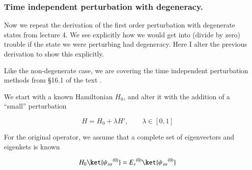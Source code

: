%
%
%
%
%
\subsubsection{Time independent perturbation with degeneracy.}

Now we repeat the derivation of the first order perturbation with degenerate states from lecture 4.  We see explicitly how we would get into (divide by zero) trouble if the state we were perturbing had degeneracy.  Here I alter the previous derivation to show this explicitly.


Like the non-degenerate case, we are covering the time independent perturbation methods from \S 16.1 of the text \cite{desai2009quantum}.

We start with a known Hamiltonian $H_0$, and alter it with the addition of a ``small'' perturbation

\begin{equation}\label{eqn:qmTwoL5a:10}
H = H_0 + \lambda H', \qquad \lambda \in [0,1]
\end{equation}

For the original operator, we assume that a complete set of eigenvectors and eigenkets is known

\begin{equation}\label{eqn:qmTwoL5a:30}
H_0 \ket{{\psi_{s \alpha}}^{(0)}} = {E_s}^{(0)} \ket{{\psi_{s \alpha}}^{(0)}}
\end{equation}

